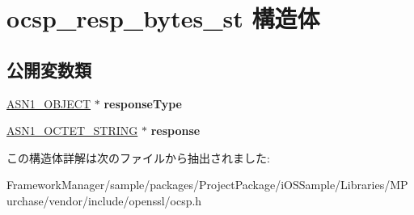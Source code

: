 \hypertarget{structocsp__resp__bytes__st}{}\section{ocsp\+\_\+resp\+\_\+bytes\+\_\+st 構造体}
\label{structocsp__resp__bytes__st}
\subsection*{公開変数類}
\begin{DoxyCompactItemize}
\item 
\hypertarget{structocsp__resp__bytes__st_a304d3f8cf4f98279dca0624763ce8b01}{}\hyperlink{structasn1__object__st}{A\+S\+N1\+\_\+\+O\+B\+J\+E\+C\+T} $\ast$ {\bfseries response\+Type}\label{structocsp__resp__bytes__st_a304d3f8cf4f98279dca0624763ce8b01}

\item 
\hypertarget{structocsp__resp__bytes__st_a98f9926c70716d7d4438aa7e87d17649}{}\hyperlink{structasn1__string__st}{A\+S\+N1\+\_\+\+O\+C\+T\+E\+T\+\_\+\+S\+T\+R\+I\+N\+G} $\ast$ {\bfseries response}\label{structocsp__resp__bytes__st_a98f9926c70716d7d4438aa7e87d17649}

\end{DoxyCompactItemize}


この構造体詳解は次のファイルから抽出されました\+:\begin{DoxyCompactItemize}
\item 
Framework\+Manager/sample/packages/\+Project\+Package/i\+O\+S\+Sample/\+Libraries/\+M\+Purchase/vendor/include/openssl/ocsp.\+h\end{DoxyCompactItemize}
